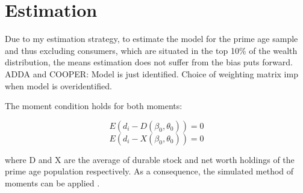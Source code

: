 \documentclass[12pt,a4paper,leqno]{article}
\theoremstyle{definition}
\begin{document}

\section{Estimation}
\label{estimation_procedure}

Due to my estimation strategy, to estimate the model for the prime age sample and thus excluding consumers, which are situated in the top 10\% of the wealth distribution, the means estimation does not suffer from the bias \cite{cagetti2003} puts forward. \\  

ADDA and COOPER: 
Model is just identified. Choice of weighting matrix imp when model is overidentified. 

The moment condition holds for both moments: 

\[ E(d_{i} -  D(\beta_{0},\theta_{0})) = 0 \]
\[ E(d_{i} -  X(\beta_{0},\theta_{0})) = 0 \]

where D and X are the average of durable stock and net worth holdings of the prime age population respectively. As a consequence, the simulated method of moments can be applied \citep{duffie1993}.\\
\end{document}

